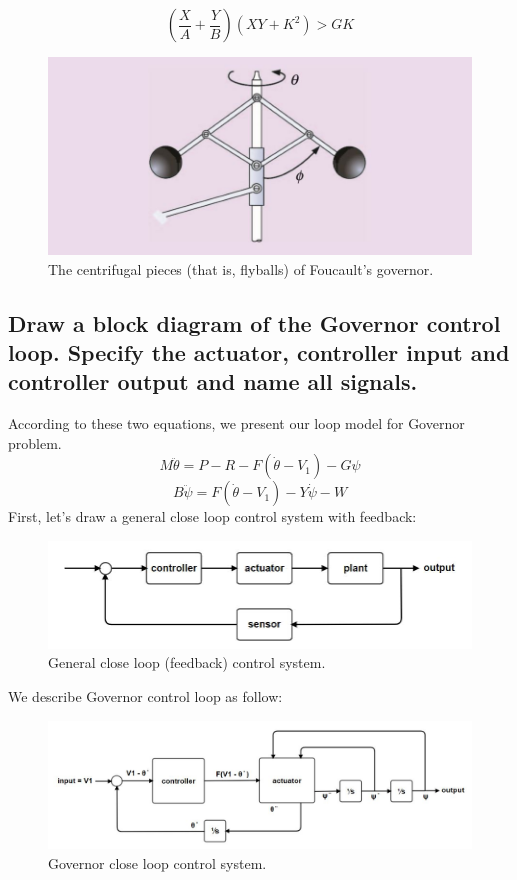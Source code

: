 \documentclass[11pt]{scrartcl} %
\begin{document}
\begin{equation}
\left(\frac{X}{A}+\frac{Y}{B}\right)\left(X Y+K^{2}\right)>G K
\end{equation}
\begin{figure}[h] 
	\centering
	\includegraphics[width=0.5\columnwidth]{images/p4.JPG}
	\caption{The centrifugal pieces (that is, flyballs) of Foucault’s governor.}
\end{figure} \newpage
\subsection{Draw a block diagram of the Governor control loop. Specify the actuator, controller input and controller output and name all signals.}
According to these two equations, we present our loop model for Governor problem. 
\begin{equation}M \ddot{\theta}=P-R-F\left(\dot{\theta}-V_{1}\right)-G \psi\end{equation}
\begin{equation}B \ddot{\psi}=F\left(\dot{\theta}-V_{1}\right)-Y \dot{\psi}-W\end{equation}
First, let's draw a general close loop control system with feedback:
\begin{figure}[h] 
	\centering
	\includegraphics[width=0.8\columnwidth]{images/p5.JPG}
	\caption{General close loop (feedback) control system.}
\end{figure} 
\newline We describe Governor control loop as follow:
\begin{figure}[h] 
	\centering
	\includegraphics[width=0.9\columnwidth]{images/p6.JPG}
	\caption{Governor close loop control system.}
\end{figure} 
\end{document}
